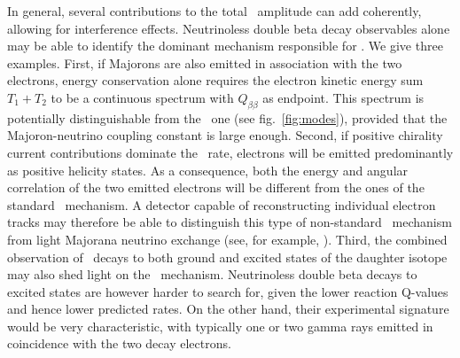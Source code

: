 In general, several contributions to the total \bbonu\ amplitude can add coherently, allowing for interference effects. Neutrinoless double beta decay observables alone may be able to identify the dominant mechanism responsible for \bbonu. We give three examples. First, if Majorons are also emitted in association with the two electrons, energy conservation alone requires the electron kinetic energy sum $T_1+T_2$ to be a continuous spectrum with $Q_{\beta\beta}$ as endpoint. This spectrum is potentially distinguishable from the \bbtnu\ one (see fig.~\ref{fig:modes}), provided that the Majoron-neutrino coupling constant is large enough. Second, if positive chirality current contributions dominate the \bbonu\ rate, electrons will be emitted predominantly as positive helicity states. As a consequence, both the energy and angular correlation of the two emitted electrons will be different from the ones of the standard \bbonu\ mechanism. A detector capable of reconstructing individual electron tracks may therefore be able to distinguish this type of non-standard \bbonu\ mechanism from light Majorana neutrino exchange (see, for example, \cite{SuperNEMO:2010wnd}). Third, the combined observation of \bbonu\ decays to both ground and excited states of the daughter isotope may also shed light on the \bbonu\ mechanism. Neutrinoless double beta decays to excited states are however harder to search for, given the lower reaction Q-values and hence lower predicted rates. On the other hand, their experimental signature would be very characteristic, with typically one or two gamma rays emitted in coincidence with the two decay electrons. 
%

